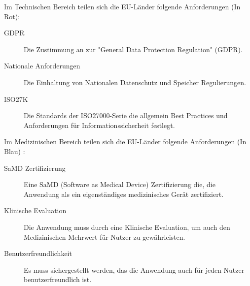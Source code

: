 \documentclass{article}
\begin{document}
		\newpage 
		Im Technischen Bereich teilen sich die EU-Länder folgende Anforderungen (In Rot):
		\begin{description}
			\item[GDPR] Die Zustimmung an zur "General Data Protection Regulation" (GDPR).
			\item[Nationale Anforderungen] Die Einhaltung von Nationalen Datenschutz und Speicher Regulierungen.
			\item[ISO27K] Die Standards der ISO27000-Serie die allgemein Best Practices und Anforderungen für Informationssicherheit festlegt.   
		\end{description}
		Im Medizinischen Bereich teilen sich die EU-Länder folgende Anforderungen (In Blau) \cite{dtx-regulatory-frameworks}:
		\begin{description}
			\item[SaMD Zertifizierung] Eine SaMD (Software as Medical Device) Zertifizierung die, die Anwendung als ein eigenständiges medizinisches Gerät zertifiziert.
			\item[Klinische Evaluation] Die Anwendung muss durch eine Klinische Evaluation, um auch den Medizinischen Mehrwert für Nutzer zu gewährleisten.
			\item[Benutzerfreundlichkeit] Es muss sichergestellt werden, das die Anwendung auch für jeden Nutzer benutzerfreundlich ist.
		\end{description}
		\newpage  
\end{document}
